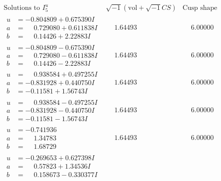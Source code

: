 \documentclass[1p]{elsarticle_modified}
\theoremstyle{definition}
\newcommand{\I}{\sqrt{-1}}
\begin{document}
$$\begin{array}{c|c|c}  
\text{Solutions to }I^u_{5}& \I (\text{vol} + \sqrt{-1}CS) & \text{Cusp shape}\\
 \hline 
\begin{aligned}
u &= -0.804809 + 0.675390 I \\
a &= \phantom{-}0.729080 + 0.611838 I \\
b &= \phantom{-}0.14426 + 2.22883 I\end{aligned}
 & \phantom{-}1.64493\phantom{ +0.000000I} & \phantom{-}6.00000\phantom{ +0.000000I} \\ \hline\begin{aligned}
u &= -0.804809 - 0.675390 I \\
a &= \phantom{-}0.729080 - 0.611838 I \\
b &= \phantom{-}0.14426 - 2.22883 I\end{aligned}
 & \phantom{-}1.64493\phantom{ +0.000000I} & \phantom{-}6.00000\phantom{ +0.000000I} \\ \hline\begin{aligned}
u &= \phantom{-}0.938584 + 0.497255 I \\
a &= -0.831928 + 0.440750 I \\
b &= -0.11581 + 1.56743 I\end{aligned}
 & \phantom{-}1.64493\phantom{ +0.000000I} & \phantom{-}6.00000\phantom{ +0.000000I} \\ \hline\begin{aligned}
u &= \phantom{-}0.938584 - 0.497255 I \\
a &= -0.831928 - 0.440750 I \\
b &= -0.11581 - 1.56743 I\end{aligned}
 & \phantom{-}1.64493\phantom{ +0.000000I} & \phantom{-}6.00000\phantom{ +0.000000I} \\ \hline\begin{aligned}
u &= -0.741936\phantom{ +0.000000I} \\
a &= \phantom{-}1.34783\phantom{ +0.000000I} \\
b &= \phantom{-}1.68729\phantom{ +0.000000I}\end{aligned}
 & \phantom{-}1.64493\phantom{ +0.000000I} & \phantom{-}6.00000\phantom{ +0.000000I} \\ \hline\begin{aligned}
u &= -0.269653 + 0.627398 I \\
a &= \phantom{-}0.57823 + 1.34536 I \\
b &= \phantom{-}0.158673 - 0.330377 I\end{aligned}

\end{array}$$
\end{document}
